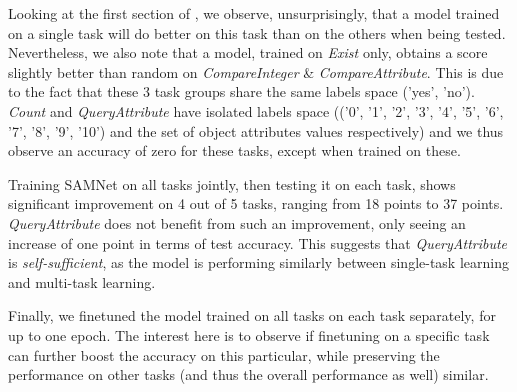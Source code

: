 Looking at the first section of , we observe, unsurprisingly, that a model trained on a single task will do better on this task than on the others when being tested. Nevertheless, we also note that a model, trained on \textit{Exist} only, obtains a score slightly better than random on \textit{CompareInteger} \& \textit{CompareAttribute}. This is due to the fact that these 3 task groups share the same labels space ('yes', 'no'). \textit{Count} and \textit{QueryAttribute} have isolated labels space (('0', '1', '2', '3', '4', '5', '6', '7', '8', '9', '10') and the set of object attributes values respectively) and we thus observe an accuracy of zero for these tasks, except when trained on these.

Training SAMNet on all tasks jointly, then testing it on each task, shows significant improvement on 4 out of 5 tasks, ranging from 18 points to 37 points. \textit{QueryAttribute} does not benefit from such an improvement, only seeing an increase of one point in terms of test accuracy. This suggests that \textit{QueryAttribute} is \textit{self-sufficient}, as the model is performing similarly between single-task learning and multi-task learning.

Finally, we finetuned the model trained on all tasks on each task separately, for up to one epoch. The interest here is to observe if finetuning on a specific task can further boost the accuracy on this particular, while preserving the performance on other tasks (and thus the overall performance as well) similar.


